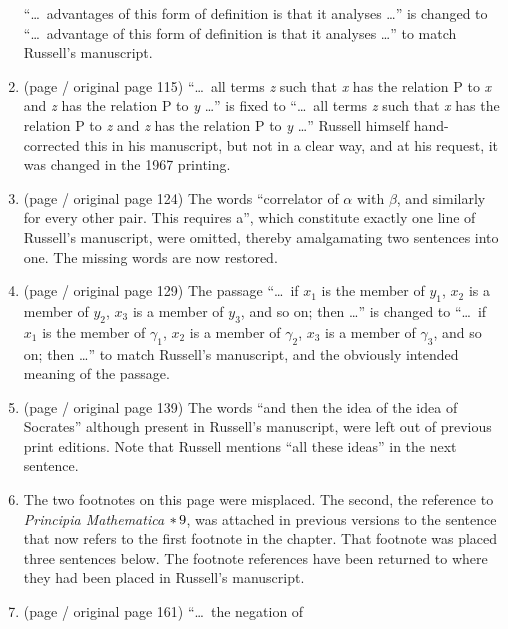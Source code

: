\begin{enumerate}
``\ldots\ ad\-van\-tages of this form of definition is that it
analyses \ldots'' is changed to ``\ldots\ advantage of this form of definition is that it
analyses \ldots'' to match Russell's manuscript.
\item (page \pageref{change:xz} / original page 115) ``\ldots\ all
terms \textit{z}
such that \textit{x}
has the relation P
to \textit{x} and \textit{z} has the relation
P to \textit{y} \ldots'' is fixed to 
``\ldots\ all
terms \textit{z}
such that \textit{x}
has the relation P
to \textit{z} and \textit{z} has the relation
P to \textit{y} \ldots''\kksentencespace
 Russell himself hand-corrected this in his manuscript, but not in
a clear way, and at his request, it was changed in the 1967 printing. 
\item (page \pageref{change:missingline} / original page 124) The words ``correlator of $\alpha$ with $\beta$, and similarly for every other pair. 
This requires a'', which constitute exactly one line of Russell's manuscript, \aftonly{\linebreak[4]}were omitted, thereby
amalgamating two sentences into one. The missing
words are now restored.
\item (page \pageref{change:ygammas} / original page 129) The passage
``\ldots\ if $x_1$ is the member of 
$y_1$,
$x_2$ is a
member of $y_2$, $x_3$
is a member of $y_3$, and so
on; then \ldots'' is changed to ``\ldots\ if $x_1$ is the member of 
$\gamma_1$,
$x_2$ is a
member of $\gamma_2$, $x_3$
is a member of $\gamma_3$, and so
on; then \ldots'' to match Russell's manuscript, and the obviously intended
meaning of the passage.  
\item (page \pageref{change:socrates} / original page 139) The words ``and then 
the idea of the idea of Socrates'' although present in Russell's man\-u\-script, were
left out of previous print editions. Note that Russell mentions ``all these ideas'' in the
next sentence.  
\item {} The
two footnotes on this page were misplaced. The second, the reference to \textit{Principia
Mathematica} $*\thinspace 9$, was attached in previous versions to the sentence that now 
refers to the first
footnote in the chapter. That footnote was placed three sentences below. The footnote
references have been returned to where they had been placed in Russell's manuscript.
\item (page \pageref{change:pfeifferphi} / original page 161) ``\ldots\ the negation of

\end{enumerate}
